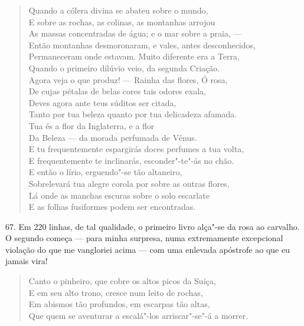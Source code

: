 \begin{verse}
Quando a cólera divina se abateu sobre o mundo,\\
E sobre as rochas, as colinas, as montanhas arrojou\\
As massas concentradas de água; e o mar sobre a praia, ---\\
Então montanhas desmoronaram, e vales, antes desconhecidos,\\
Permaneceram onde estavam. Muito diferente era a Terra,\\
Quando o primeiro dilúvio veio, da segunda Criação.\\
Agora veja o que produz! --- Rainha das flores, Ó rosa,\\
De cujas pétalas de belas cores tais odores exala,\\
Deves agora ante teus súditos ser citada,\\
Tanto por tua beleza quanto por tua delicadeza afamada.\\
Tua és a flor da Inglaterra, e a flor\\
Da Beleza --- da morada perfumada de Vênus.\\
E tu frequentemente espargirás doces perfumes a tua volta,\\
E frequentemente te inclinarás, esconder"-te"-ás no chão.\footnotemark\\
E então o lírio, erguendo"-se tão altaneiro,\\
Sobrelevará tua alegre corola por sobre as outras flores,\\
Lá onde as manchas escuras sobre o solo escarlate\\
E as folhas fusiformes podem ser encontradas.
\end{verse}

67. Em 220 linhas, de tal qualidade, o primeiro livro alça"-se da rosa ao
carvalho. O segundo começa --- para minha surpresa, numa extremamente
excepcional violação do que me vangloriei acima --- com uma enlevada
apóstrofe ao que eu jamais vira!

\begin{verse}
Canto o pinheiro, que cobre os altos picos da Suíça\footnotemark,\\
E em seu alto trono, cresce num leito de rochas,\\
Em abismos tão profundos, em escarpas tão altas,\\
Que quem se aventurar a escalá"-los arriscar"-se"-á a morrer.
\end{verse}

